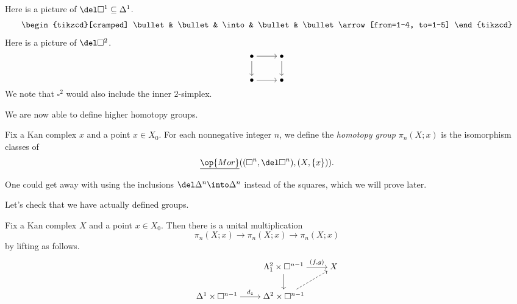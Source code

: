 \documentclass[../notes.tex]{subfiles}
\begin{document}
\begin{example}
	Here is a picture of $\del\square^1\subseteq\Delta^1$.
	\[\begin{tikzcd}[cramped]
		\bullet & \bullet & \into & \bullet & \bullet
		\arrow[from=1-4, to=1-5]
	\end{tikzcd}\]
	Here is a picture of $\del\square^2$.
	\[\begin{tikzcd}[cramped]
		\bullet & \bullet \\
		\bullet & \bullet
		\arrow[from=1-1, to=1-2]
		\arrow[from=1-1, to=2-1]
		\arrow[from=1-2, to=2-2]
		\arrow[from=2-1, to=2-2]
	\end{tikzcd}\]
	We note that $\square^2$ would also include the inner $2$-simplex.
\end{example}
We are now able to define higher homotopy groups.
\begin{definition}
	Fix a Kan complex $x$ and a point $x\in X_0$. For each nonnegative integer $n$, we define the \textit{homotopy group} $\pi_n(X;x)$ is the isomorphism classes of
	\[\underline{\op{Mor}}((\square^n,\del\square^n),(X,\{x\})).\]
\end{definition}
\begin{remark}
	One could get away with using the inclusions $\del\Delta^n\into\Delta^n$ instead of the squares, which we will prove later.
\end{remark}
Let's check that we have actually defined groups.
\begin{lemma}
	Fix a Kan complex $X$ and a point $x\in X_0$. Then there is a unital multiplication
	\[\pi_n(X;x)\to\pi_n(X;x)\to\pi_n(X;x)\]
	by lifting as follows.
	\[\begin{tikzcd}[cramped]
		& {\Lambda_1^2\times\square^{n-1}} & X \\
		{\Delta^1\times\square^{n-1}} & {\Delta^2\times\square^{n-1}}
		\arrow["{(f,g)}", from=1-2, to=1-3]
		\arrow[from=1-2, to=2-2]
		\arrow["{d_1}", from=2-1, to=2-2]
		\arrow[dashed, from=2-2, to=1-3]
	\end{tikzcd}\]
\end{lemma}
\end{document}
